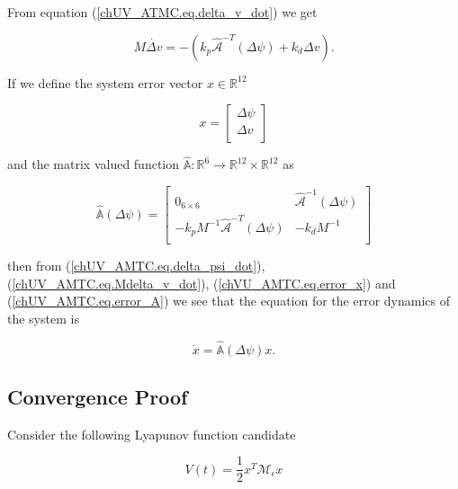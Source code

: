 \noindent From equation (\ref{chUV_ATMC.eq.delta_v_dot}) we get

\begin{equation}\label{chUV_AMTC.eq.Mdelta_v_dot}
M \dot{\Delta v} =       -(k_p\hat{\mathcal{A}}^{-T}(\Delta \psi)+k_d\Delta v).
\end{equation}

\noindent If we define the system error vector $x\in\mathbb{R}^{12}$

\begin{equation}\label{chVU_AMTC.eq.error_x}
x=\left[ \begin{array}{c}
     \Delta \psi           \\
     \Delta v              \\
\end{array} \right]
\end{equation}

\noindent and the matrix valued function
$\hat{\mathbb{A}}:\mathbb{R}^6\to\mathbb{R}^{12}\times\mathbb{R}^{12}$ as

\begin{equation}\label{chUV_AMTC.eq.error_A}
\hat{\mathbb{A}}(\Delta \psi)=
\left[ \begin{array}{cc}
     0_{6\times 6}   & \hat{\mathcal{A}}^{-1}(\Delta \psi)             \\
     -k_p M^{-1}\hat{\mathcal{A}}^{-T}(\Delta \psi)   &  -k_d M^{-1}   \\
\end{array} \right]
\end{equation}

\noindent then from (\ref{chUV_AMTC.eq.delta_psi_dot}),
(\ref{chUV_AMTC.eq.Mdelta_v_dot}), (\ref{chVU_AMTC.eq.error_x}) and
(\ref{chUV_AMTC.eq.error_A}) we see that the equation for the error
dynamics of the system  is

\begin{equation} \label{chUV_AMTC.eq.err_sys}
\dot{x}=\hat{\mathbb{A}}(\Delta \psi) x.
\end{equation}


\subsection{Convergence Proof}\label{chUV_AMTC.sec.proof_MBC}

Consider the following Lyapunov function candidate

\begin{equation} \label{chUV_AMTC.eq.lyap}
V(t)=\frac{1}{2} x^T\mathcal{M}_\epsilon x
\end{equation}

